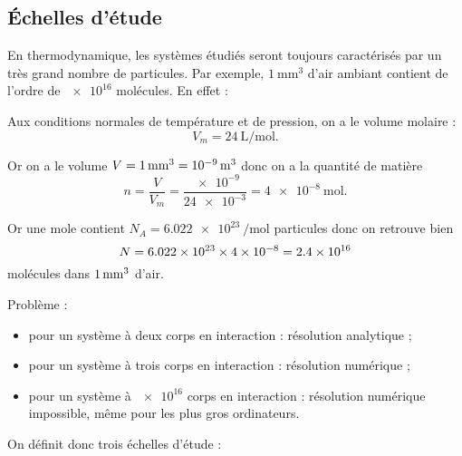 \subsection{Échelles d'étude}

En thermodynamique, les systèmes étudiés seront toujours caractérisés par un très grand nombre de particules. Par exemple, \(\SI{1}{\milli\meter\cubed}\) d'air ambiant contient de l'ordre de \(\num{e16}\) molécules. En effet :

Aux conditions normales de température et de pression, on a le volume molaire : \[V_m=\SI{24}{\liter\per\mole}.\]

Or on a le volume \(V=\SI{1}{mm\cubed}=\SI{e-9}{\meter\cubed}\) donc on a la quantité de matière \[n=\dfrac{V}{V_m}=\dfrac{\num{e-9}}{\num{24e-3}}=\SI{4e-8}{\mole}.\]

Or une mole contient \(N_A=\SI{6.022e23}{\per\mole}\) particules donc on retrouve bien \[N=\numproduct{6.022e23x4e-8}=\num{2.4e16}\] molécules dans \(\SI{1}{mm\cubed}\) d'air.

Problème : \begin{itemize}
\item pour un système à deux corps en interaction : résolution analytique ;

\item pour un système à trois corps en interaction : résolution numérique ;

\item pour un système à \(\num{e16}\) corps en interaction : résolution numérique impossible, même pour les plus gros ordinateurs.\\
\end{itemize}

On définit donc trois échelles d'étude :

